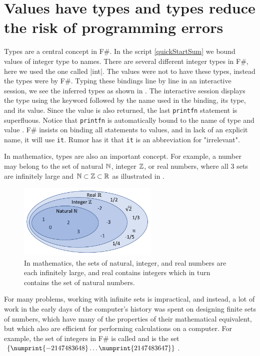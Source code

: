 \documentclass[fsharpNotes.tex]{subfiles}
\begin{document}
\section{Values have types and types reduce the risk of programming errors}
Types are a central concept in F\#. In the script \ref{quickStartSum} we bound values of integer type to names. There are several different integer types in F\#, here we used the one called \keyword|int|. The values were not  to have these types, instead the types were  by F\#. Typing these bindings line by line in an interactive session, we see the inferred types as shown in .
%
%
The interactive session displays the type using the  keyword followed by the name used in the binding, its type, and its value. Since the value is also returned, the last \lstinline|printfn| statement is superfluous. Notice that \lstinline{printfn} is automatically bound to the name  of type  and value \idx[{()}@\lstinline{()}]{\lexeme{()}}. F\# insists on binding all statements to values, and in lack of an explicit name, it will use \lstinline{it}. Rumor has it that \lstinline{it} is an abbreviation for "irrelevant".

In mathematics, types are also an important concept. For example, a number may belong to the set of natural $\mathbb{N}$, integer $\mathbb{Z}$, or real numbers, where all 3 sets are infinitely large and $\mathbb{N}\subset\mathbb{Z}\subset\mathbb{R}$ as illustrated in .
\begin{figure} %
  \centering
  \includegraphics[width=0.6\textwidth]{numbers}
  \caption{In mathematics, the sets of natural, integer, and real numbers are each infinitely large, and real contains integers which in turn contains the set of natural numbers.}
  \label{fig:numbers}
\end{figure}
For many problems, working with infinite sets is impractical, and instead, a lot of work in the early days of the computer's history was spent on designing finite sets of numbers, which have many of the properties of their mathematical equivalent, but which also are efficient for performing calculations on a computer. For example, the set of integers in F\# is called  and is the set $\{\numprint{-2147483648} \ldots \numprint{2147483647}\}$.
\end{document}
